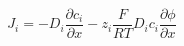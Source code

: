 \documentclass[preview]{standalone}
\begin{document}
\[J_i = -D_i \frac{\partial c_i}{\partial x} - z_i \frac{F}{RT} D_i c_i \frac{\partial \phi}{\partial x} \tag{2.8}\]
\end{document}
